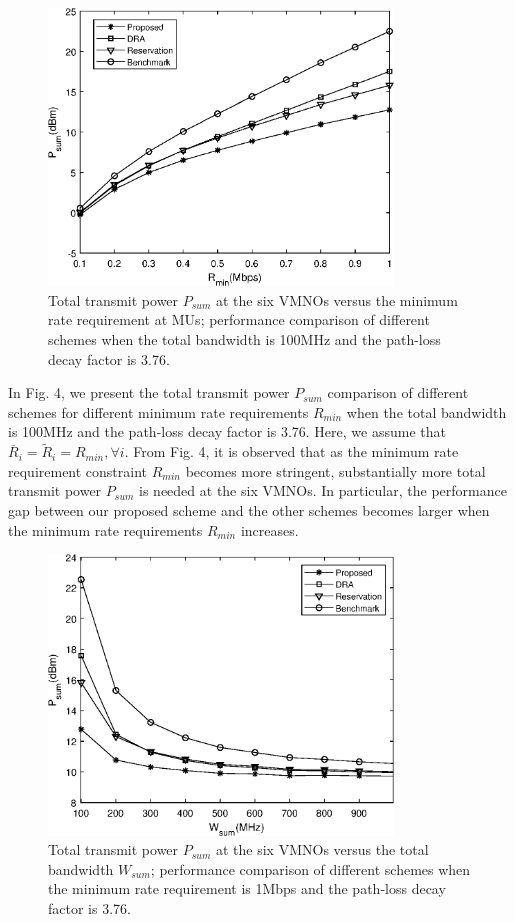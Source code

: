 \documentclass[journal]{IEEEtran}
\begin{document}
\begin{figure}
	\centering
	\includegraphics[width=3.6in]{P_rmin.eps}
	\caption{Total transmit power $P_{sum}$ at the six VMNOs versus the minimum rate requirement at MUs; performance comparison of different schemes when the total bandwidth is 100MHz and the path-loss decay factor is 3.76.}
\end{figure}

In Fig. 4, we present the total transmit power $P_{sum}$ comparison of different schemes for different minimum rate requirements $R_{min}$ when the total bandwidth is 100MHz and the path-loss decay factor is 3.76. Here, we assume that $\bar{R}_i = \tilde{R}_i= R_{min}, \forall i$. From Fig. 4, it is observed that as the minimum rate requirement constraint $R_{min}$ becomes more stringent, substantially more total transmit power $P_{sum}$ is needed at the six VMNOs. In particular, the performance gap between our proposed scheme and the other schemes becomes larger when the minimum rate requirements $R_{min}$ increases.

\begin{figure}
	\centering
	\includegraphics[width=3.6in]{P_wsum.eps}
	\caption{Total transmit power $P_{sum}$ at the six VMNOs versus the total bandwidth $W_{sum}$; performance comparison of different schemes when the minimum rate requirement is 1Mbps and the path-loss decay factor is 3.76.}
\end{figure}
\end{document}
